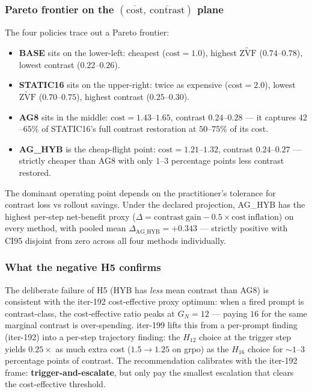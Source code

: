 \documentclass{article}
\newcommand{\zvf}{\ensuremath{\widetilde{\mathrm{ZVF}}}}
\begin{document}
\subsubsection*{Pareto frontier on the $(\overline{\mathrm{cost}},\ \overline{\mathrm{contrast}})$ plane}

The four policies trace out a Pareto frontier:
\begin{itemize}
\item \textbf{BASE} sits on the lower-left: cheapest ($\mathrm{cost}=1.0$),
  highest $\zvf$ ($0.74$–$0.78$), lowest contrast ($0.22$–$0.26$).
\item \textbf{STATIC16} sits on the upper-right: twice as expensive
  ($\mathrm{cost}=2.0$), lowest $\zvf$ ($0.70$–$0.75$), highest contrast
  ($0.25$–$0.30$).
\item \textbf{AG8} sits in the middle: $\mathrm{cost}=1.43$–$1.65$, contrast
  $0.24$–$0.28$ — it captures $42$–$65\%$ of STATIC16's full contrast
  restoration at $50$–$75\%$ of its cost.
\item \textbf{AG\_HYB} is the cheap-flight point: $\mathrm{cost}=1.21$–$1.32$,
  contrast $0.24$–$0.27$ — strictly cheaper than AG8 with only $1$–$3$
  percentage points less contrast restored.
\end{itemize}
The dominant operating point depends on the practitioner's tolerance for
contrast loss vs rollout savings. Under the declared projection, AG\_HYB has
the highest per-step net-benefit proxy
($\Delta = \mathrm{contrast\ gain} - 0.5 \times \mathrm{cost\ inflation}$)
on every method, with pooled mean $\Delta_{\text{AG\_HYB}}=+0.343$ —
strictly positive with CI95 disjoint from zero across all four methods
individually.

\subsubsection*{What the negative H5 confirms}

The deliberate failure of H5 (HYB has \emph{less} mean contrast than AG8) is
consistent with the iter-192 cost-effective proxy optimum: when a fired
prompt is contrast-class, the cost-effective ratio peaks at $G_N=12$ — paying
$16$ for the same marginal contrast is over-spending. iter-199 lifts this
from a per-prompt finding (iter-192) into a per-step trajectory finding: the
$H_{12}$ choice at the trigger step yields $0.25\times$ as much extra cost
($1.5 \to 1.25$ on grpo) as the $H_{16}$ choice for $\sim 1$–$3$ percentage
points of contrast. The recommendation calibrates with the iter-192 frame:
\textbf{trigger-and-escalate}, but only pay the smallest escalation that
clears the cost-effective threshold.
\end{document}
